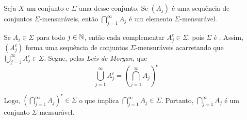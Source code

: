 \begin{proposition}
\label{prop:interseção-elementos-sigmas}
    Seja $X$ um conjunto e $\Sigma$ uma \sigal desse conjunto.
    Se $(A_j)$ é uma sequência  de conjuntos $\Sigma $-mensuráveis, então $\displaystyle \bigcap_{j = 1}^\infty A_j$ é um elemento $\Sigma$-mensurável.
\end{proposition}
\begin{prova}
    Se $A_j \in \Sigma$ para todo $j \in \operatorname{\mathbb{N}}$, então cada complementar $A_j^c \in \Sigma$, pois $\Sigma$ é \sigal. 
    Assim, $(A_j^c)$ forma uma sequência de conjuntos $\Sigma$-mensuráveis acarretando que 
    $\displaystyle \bigcup_{j = 1}^\infty A_j^c \in \Sigma$. 
    Segue, pelas \textit{Leis de Morgan}, que 
    $$
    \displaystyle \bigcup_{j = 1}^\infty A_j^c 
    = \left(\displaystyle \bigcap_{j = 1}^\infty A_j\right)^c
  $$

Logo, $\left(\displaystyle \bigcap_{j = 1}^\infty A_j\right)^c \in \Sigma$ o que implica $\displaystyle \bigcap_{j = 1}^\infty A_j \in \Sigma$. 
Portanto, $\displaystyle \bigcap_{j = 1}^\infty A_j$ é um conjunto $\Sigma$-mensurável.
\end{prova}







